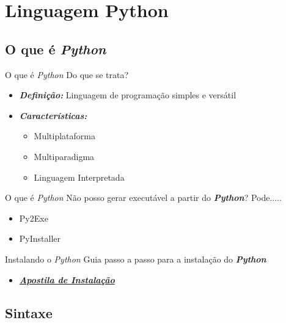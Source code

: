 \documentclass{beamer}
\begin{document}
\section{Linguagem Python}

\subsection{O que é \textit{Python}}

\begin{frame}{O que é \textit{Python}}
	\label{o_que_e_python}
	Do que se trata?
	\begin{itemize}
		\item \textbf{\textit{Definição:}} Linguagem de programação simples e versátil
		\item \textbf{\textit{Características:}}
		\begin{itemize}
			\item Multiplataforma
			\item Multiparadigma
			\item Linguagem Interpretada
		\end{itemize}
	\end{itemize}
\end{frame}

\begin{frame}{O que é \textit{Python}}
	\label{py2exe}
	Não posso gerar executável a partir do \textbf{\textit{Python}}? Pode.....
	\begin{itemize}
		\item Py2Exe
		\item PyInstaller
	\end{itemize}
\end{frame}

\begin{frame}{Instalando o \textit{Python}}
	\label{instalacao}
	Guia passo a passo para a instalação do \textbf{\textit{Python}}
	
	\begin{itemize}
		\item \href{bibliografia/Guia_Instalacao_Python.pdf}{\textbf{\textit{Apostila de Instalação}}}
	\end{itemize}
	
\end{frame}


\subsection{Sintaxe}
\end{document}
